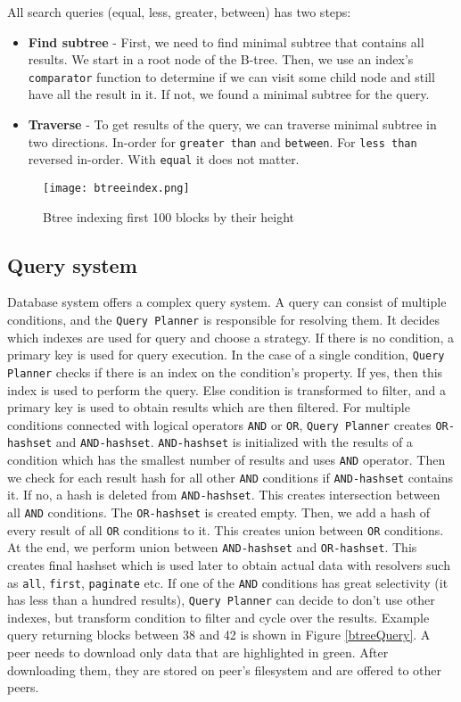 All search queries (equal, less, greater, between) has two steps:
\begin{itemize}
    \item \textbf{Find subtree} - First, we need to find minimal subtree that contains all results. We start in a root node of the B-tree. Then, we use an index's \texttt{comparator} function to determine if we can visit some child node and still have all the result in it. If not, we found a minimal subtree for the query.
    \item \textbf{Traverse} - To get results of the query, we can traverse minimal subtree in two directions. In-order for \texttt{greater than} and \texttt{between}. For \texttt{less than} reversed in-order. With \texttt{equal} it does not matter.
\end{itemize}

\begin{figure}[h]
    \centering
    \texttt{[image: btreeindex.png]}
    \caption{Btree indexing first 100 blocks by their height}
    \label{btree}
\end{figure}

\subsection{Query system}
Database system offers a complex query system. A query can consist of multiple conditions, and the \texttt{Query Planner} is responsible for resolving them. It decides which indexes are used for query and choose a strategy. If there is no condition, a primary key is used for query execution. In the case of a single condition, \texttt{Query Planner} checks if there is an index on the condition's property. If yes, then this index is used to perform the query. Else condition is transformed to filter, and a primary key is used to obtain results which are then filtered. For multiple conditions connected with logical operators \texttt{AND} or \texttt{OR}, \texttt{Query Planner} creates \texttt{OR-hashset} and \texttt{AND-hashset}. \texttt{AND-hashset} is initialized with the results of a condition which has the smallest number of results and uses \texttt{AND} operator. Then we check for each result hash for all other \texttt{AND} conditions if \texttt{AND-hashset} contains it. If no, a hash is deleted from \texttt{AND-hashset}. This creates intersection between all \texttt{AND} conditions. The \texttt{OR-hashset} is created empty. Then, we add a hash of every result of all \texttt{OR} conditions to it. This creates union between \texttt{OR} conditions. At the end, we perform union between \texttt{AND-hashset} and \texttt{OR-hashset}. This creates final hashset which is used later to obtain actual data with resolvers such as \texttt{all}, \texttt{first}, \texttt{paginate} etc. If one of the \texttt{AND} conditions has great selectivity (it has less than a hundred results), \texttt{Query Planner} can decide to don't use other indexes, but transform condition to filter and cycle over the results. Example query returning blocks between 38 and 42 is shown in Figure \ref{btreeQuery}. A peer needs to download only data that are highlighted in green. After downloading them, they are stored on peer's filesystem and are offered to other peers. 

